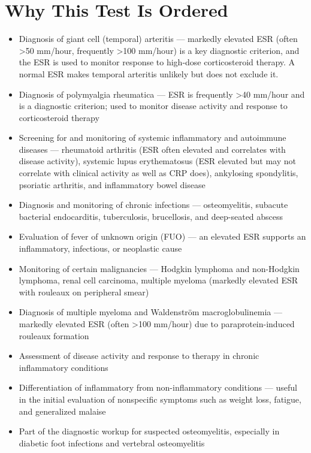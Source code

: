 \section*{Why This Test Is Ordered}
\begin{itemize}
  \item Diagnosis of giant cell (temporal) arteritis --- markedly elevated ESR (often >50 mm/hour, frequently >100 mm/hour) is a key diagnostic criterion, and the ESR is used to monitor response to high-dose corticosteroid therapy. A normal ESR makes temporal arteritis unlikely but does not exclude it.
  \item Diagnosis of polymyalgia rheumatica --- ESR is frequently >40 mm/hour and is a diagnostic criterion; used to monitor disease activity and response to corticosteroid therapy
  \item Screening for and monitoring of systemic inflammatory and autoimmune diseases --- rheumatoid arthritis (ESR often elevated and correlates with disease activity), systemic lupus erythematosus (ESR elevated but may not correlate with clinical activity as well as CRP does), ankylosing spondylitis, psoriatic arthritis, and inflammatory bowel disease
  \item Diagnosis and monitoring of chronic infections --- osteomyelitis, subacute bacterial endocarditis, tuberculosis, brucellosis, and deep-seated abscess
  \item Evaluation of fever of unknown origin (FUO) --- an elevated ESR supports an inflammatory, infectious, or neoplastic cause
  \item Monitoring of certain malignancies --- Hodgkin lymphoma and non-Hodgkin lymphoma, renal cell carcinoma, multiple myeloma (markedly elevated ESR with rouleaux on peripheral smear)
  \item Diagnosis of multiple myeloma and Waldenstr\"{o}m macroglobulinemia --- markedly elevated ESR (often >100 mm/hour) due to paraprotein-induced rouleaux formation
  \item Assessment of disease activity and response to therapy in chronic inflammatory conditions
  \item Differentiation of inflammatory from non-inflammatory conditions --- useful in the initial evaluation of nonspecific symptoms such as weight loss, fatigue, and generalized malaise
  \item Part of the diagnostic workup for suspected osteomyelitis, especially in diabetic foot infections and vertebral osteomyelitis
\end{itemize}

